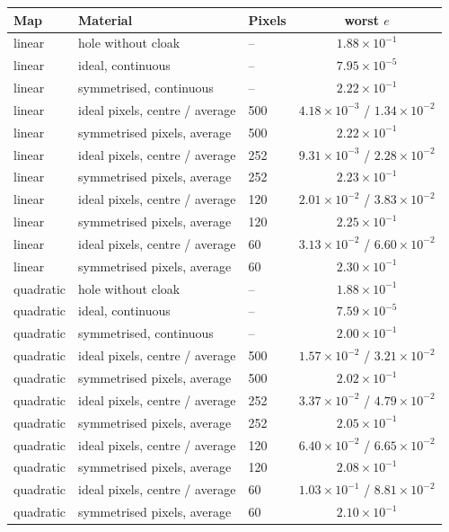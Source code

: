 \begin{tabular}{lllc}
\toprule
Map & Material & Pixels & worst $e$ \\
\midrule
linear & hole without cloak & -- & $1.88\times 10^{-1}$ \\
linear & ideal, continuous & -- & $7.95\times 10^{-5}$ \\
linear & symmetrised, continuous & -- & $2.22\times 10^{-1}$ \\
linear & ideal pixels, centre / average & 500 & $4.18\times 10^{-3}$ / $1.34\times 10^{-2}$ \\
linear & symmetrised pixels, average & 500 & $2.22\times 10^{-1}$ \\
linear & ideal pixels, centre / average & 252 & $9.31\times 10^{-3}$ / $2.28\times 10^{-2}$ \\
linear & symmetrised pixels, average & 252 & $2.23\times 10^{-1}$ \\
linear & ideal pixels, centre / average & 120 & $2.01\times 10^{-2}$ / $3.83\times 10^{-2}$ \\
linear & symmetrised pixels, average & 120 & $2.25\times 10^{-1}$ \\
linear & ideal pixels, centre / average & 60 & $3.13\times 10^{-2}$ / $6.60\times 10^{-2}$ \\
linear & symmetrised pixels, average & 60 & $2.30\times 10^{-1}$ \\
quadratic & hole without cloak & -- & $1.88\times 10^{-1}$ \\
quadratic & ideal, continuous & -- & $7.59\times 10^{-5}$ \\
quadratic & symmetrised, continuous & -- & $2.00\times 10^{-1}$ \\
quadratic & ideal pixels, centre / average & 500 & $1.57\times 10^{-2}$ / $3.21\times 10^{-2}$ \\
quadratic & symmetrised pixels, average & 500 & $2.02\times 10^{-1}$ \\
quadratic & ideal pixels, centre / average & 252 & $3.37\times 10^{-2}$ / $4.79\times 10^{-2}$ \\
quadratic & symmetrised pixels, average & 252 & $2.05\times 10^{-1}$ \\
quadratic & ideal pixels, centre / average & 120 & $6.40\times 10^{-2}$ / $6.65\times 10^{-2}$ \\
quadratic & symmetrised pixels, average & 120 & $2.08\times 10^{-1}$ \\
quadratic & ideal pixels, centre / average & 60 & $1.03\times 10^{-1}$ / $8.81\times 10^{-2}$ \\
quadratic & symmetrised pixels, average & 60 & $2.10\times 10^{-1}$ \\
\bottomrule
\end{tabular}
